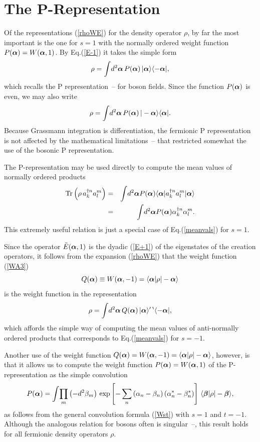\documentclass[12pt]{article}
\def\beq{\begin{equation}}
\def\eeq{\end{equation}}
\def\bea{\begin{eqnarray}}
\def\eea{\end{eqnarray}}
\def\a{\alpha}
\def\ba{{\mbox{\boldmath$\alpha$}}}
\def\sa{\alpha^*}
\def\b{\beta}
\def\bb{{\mbox{\boldmath$\beta$}}}
\def\sb{\beta^*}
\def\nn{\nonumber}
\def\dgr{\dagger}
\def\Tr{{\rm Tr}}
\def\eiss{eigenstates }
\def\op{operator }
\def\ops{operators }
\def\opsp{operators}
\def\cre{creation }
\begin{document}
\section{The P-Representation}
\par
Of the representations (\ref {rhoWE})
for the density \op $ \rho $, by far the most important
is the one for $ s = 1 $ with the normally ordered
weight function $ P( \ba ) = W( \ba , 1 ) $.
By Eq.(\ref {E-1}) it takes the simple form
\beq
\rho = \int \! d^2 \ba \, P( \ba ) \, | \ba \rangle \langle - \ba | ,
\label {Prep1} 
\eeq
which recalls the P representation~\cite{rjg2}--\cite{GDW}
for boson fields.
Since the function $ P( \ba ) $ is even,
we may also write
\beq
\rho = \int \! d^2 \ba \, P( \ba ) \, | - \ba \rangle \langle \ba | .
\label {Prep2}
\eeq
Because Grassmann integration is differentiation,
the fermionic P representation is not affected
by the mathematical limitations~\cite{rjg2}--\cite{kc2} 
that restricted somewhat the use of the bosonic
P representation.
\par
The P-representation
may be used directly to compute the mean values
of normally ordered products
\bea
\Tr \left( \rho \, a_k^{\dgr n} a^m_l \right)
& = & \int \! d^2 \ba P( \ba ) \langle \ba |
a_k^{\dgr n} a^m_l | \ba \rangle \nn\\
& = & \int \! d^2 \ba P( \ba ) \a_k^{\dgr n} \a_l^m .
\label {useofP}
\eea
This extremely useful relation 
is just a special case of Eq.(\ref {meanvals}) for $ s = 1 $\@.
\par
Since the \op $ \tilde E( \ba , 1 ) $ is
the dyadic (\ref {E+1}) of the \eiss of the
\cre \opsp, it follows from the expansion (\ref {rhoWE})
that the weight function (\ref {WA3})
\beq
Q( \ba ) \equiv W( \ba , -1 ) = \langle \ba | \rho | - \ba \rangle
\label {Qa}
\eeq
is the weight function in the representation
\beq
\rho = \int \! d^2 \ba \, Q( \ba ) \,
| \ba \rangle^\prime \, ^\backprime\langle - \ba | ,
\label {rhoQ}
\eeq
which affords the simple way of computing
the mean values of anti-normally ordered products
that corresponds to Eq.(\ref {meanvals}) for $ s = -1 $\@.
\par
Another use of the weight function
$ Q( \ba ) = W( \ba , -1 ) = \langle \ba | \rho | - \ba \rangle $,
however, is that it allows us to compute
the weight function $ P( \ba ) = W( \ba , 1 ) $
of the P-representation as the simple convolution
\beq
P( \ba ) = \int \! \prod_m \left( - d^2 \b_m \right) \,
\exp \left[ - \sum_n \left( \a_n - \b_n \right) 
\left( \sa_n - \sb_n \right) \right] \,
\langle \bb | \rho | - \bb \rangle ,
\label {PQ}
\eeq
as follows from the general convolution
formula (\ref {Wst}) with $ s = 1 $ and $ t = -1 $\@. 
Although the analogous relation for bosons 
often is singular~\cite{rjg2}--\cite{kc2},
this result holds for all fermionic density \ops $ \rho $.
\end{document}
